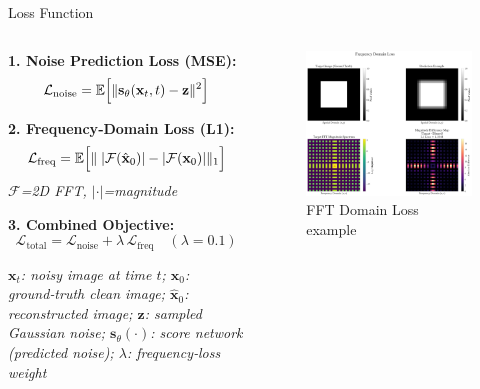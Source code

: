 \documentclass[10pt]{beamer}
\begin{document}
\begin{frame}{Loss Function}
  \begin{columns}[T]
    \begin{column}{0.55\textwidth}
      \textbf{1. Noise Prediction Loss (MSE):}
      \vspace{0.3em}
      \[
        \mathcal{L}_{\mathrm{noise}}
        = \mathbb{E}\Bigl[\|\mathbf{s}_\theta(\mathbf{x}_t,t) - \mathbf{z}\|^2\Bigr]
      \]

      \vspace{0.5em}
      \textbf{2. Frequency‑Domain Loss (L1):}
      \vspace{0.3em}
      \[
        \mathcal{L}_{\mathrm{freq}}
        = \mathbb{E}\Bigl[\|\;|\mathcal{F}(\hat{\mathbf{x}}_0)| - |\mathcal{F}(\mathbf{x}_0)|\|_1\Bigr]
      \]
      \small\emph{\(\mathcal{F}\)=2D FFT, \(|\cdot|\)=magnitude}\normalsize

      \vspace{0.5em}
      \textbf{3. Combined Objective:}
      \vspace{0.3em}
      \[
        \mathcal{L}_{\mathrm{total}}
        = \mathcal{L}_{\mathrm{noise}}
        + \lambda\,\mathcal{L}_{\mathrm{freq}}
        \quad(\lambda=0.1)
      \]

      \vspace{0.8em}
      \scriptsize
      \textit{%
        $\mathbf{x}_t$: noisy image at time $t$; \quad
        $\mathbf{x}_0$: ground‑truth clean image; \quad
        $\hat{\mathbf{x}}_0$: reconstructed image; \quad
        $\mathbf{z}$: sampled Gaussian noise; \quad
        $\mathbf{s}_\theta(\cdot)$: score network (predicted noise); \quad
        $\lambda$: frequency‐loss weight
      }
    \end{column}

    \begin{column}{0.45\textwidth}
      \centering
        \begin{figure}
            \centering
            \includegraphics[width=\linewidth]{freq_domian_loss.png}
            \caption{FFT Domain Loss example}


\end{figure}
\end{column}
\end{columns}
\end{frame}
\end{document}
